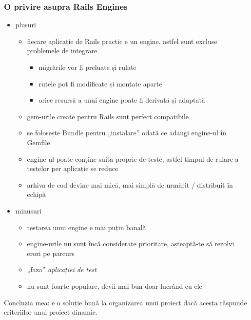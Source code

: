 \documentclass[compress]{beamer}
\begin{document}
\begin{frame}
\frametitle{O privire asupra Rails Engines}

\begin{itemize}[<+->]
  \item plusuri
    \begin{itemize}
      \item fiecare aplicație de Rails practic e un engine, astfel sunt excluse problemele de integrare
        \begin{itemize}
          \item migrările vor fi preluate și rulate
          \item rutele pot fi modificate și montate aparte
          \item orice resursă a unui engine poate fi derivată și adaptată
        \end{itemize}
      \item gem-urile create pentru Rails sunt perfect compatibile
      \item se folosește Bundle pentru „instalare” odată ce adaugi engine-ul în Gemfile
      \item engine-ul poate conține suita proprie de teste, astfel timpul de rulare a testelor per aplicație se reduce
      \item arhiva de cod devine mai mică, mai simplă de urmărit / distribuit în echipă
    \end{itemize}
  \item minusuri
    \begin{itemize}
      \item testarea unui engine e mai puțin banală
      \item engine-urile nu sunt încă considerate prioritare, așteaptă-te să rezolvi erori pe parcurs
      \item „faza” \emph{aplicației de test}
      \item nu sunt foarte populare, devii mai bun doar lucrând cu ele
    \end{itemize}
\end{itemize}
\end{frame}

\begin{frame}
  \begin{center}
    \huge Concluzia mea: e o soluție bună la organizarea unui proiect dacă acesta răspunde criteriilor unui proiect dinamic.
  \end{center}
\end{frame}
\end{document}
